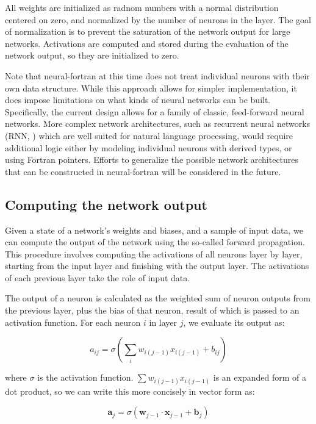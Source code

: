 \documentclass[sigplan, review=false, screen=true, balance=true]{acmart}
\begin{document}
All weights are initialized as radnom numbers with a normal distribution
centered on zero, and normalized by the number of neurons in the layer. The
goal of normalization is to prevent the saturation of the network output
for large networks.
Activations are computed and stored during the evaluation of the network output,
so they are initialized to zero.

Note that neural-fortran at this time does not treat individual neurons
with their own data structure. While this approach allows for simpler
implementation, it does impose limitations on what kinds of neural networks
can be built. Specifically, the current design allows for a family of classic,
feed-forward neural networks. More complex network architectures, such
as recurrent neural networks (RNN, \cite{hochreiter97}) which are well suited
for natural language processing, would require additional logic either by
modeling individual neurons with derived types, or using Fortran pointers.
Efforts to generalize the possible network architectures that can be constructed
in neural-fortran will be considered in the future.

\subsection{Computing the network output}

Given a state of a network's weights and biases, and a sample of input data,
we can compute the output of the network using the so-called forward propagation.
This procedure involves computing the activations of all neurons layer by layer,
starting from the input layer and finishing with the output layer. The
activations of each previous layer take the role of input data.

The output of a neuron is calculated as the weighted sum of neuron outputs
from the previous layer, plus the bias of that neuron, result of which is passed
to an activation function. For each neuron $i$ in layer $j$, we evaluate its
output as:

\begin{equation}
  \label{eq:activation}
  a_{ij} = \sigma \left( \sum_i w_{i(j-1)} x_{i(j-1)} + b_{ij} \right)
\end{equation}

where $\sigma$ is the activation function.
$\sum w_{i(j-1)} x_{i(j-1)}$ is an expanded form of a dot product,
so we can write this more concisely in vector form as:

\begin{equation}
  \label{eq:activation_vector}
  \mathbf{a}_j = \sigma \left( \mathbf{w}_{j-1} \cdot \mathbf{x}_{j-1} + \mathbf{b}_j \right)
\end{equation}
\end{document}
